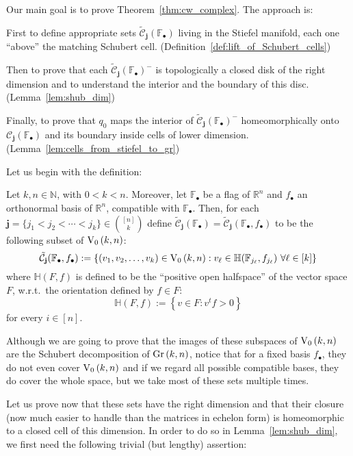 Our main goal is to prove Theorem~\ref{thm:cw_complex}. The approach is:
\begin{i_enum}
\item First to define appropriate sets $\tilde{\mathcal{C}}_{\mathbf{j}}(\mathbb{F}_{\bullet})$ living in the Stiefel manifold, each one ``above'' the matching Schubert cell. (Definition~\ref{def:lift_of_Schubert_cells})
\item Then to prove that each $\tilde{\mathcal{C}}_{\mathbf{j}}{\left(\mathbb{F}_{\bullet}\right)}^-$ is topologically a closed disk of the right dimension and to understand the interior and the boundary of this disc. (Lemma~\ref{lem:shub_dim})
\item Finally, to prove that $q_0$ maps the interior of $\tilde{\mathcal{C}}_{\mathbf{j}}(\mathbb{F}_{\bullet})^-$ homeomorphically onto $\mathcal{C}_{\mathbf{j}}(\mathbb{F}_{\bullet})$ and its boundary inside cells of lower dimension. (Lemma~\ref{lem:cells_from_stiefel_to_gr})
\end{i_enum}
Let us begin with the definition:

\begin{definition}\label{def:lift_of_Schubert_cells} Let $k,n\in\mathbb{N}$, with $0<k<n$. Moreover, let $\mathbb{F}_{\bullet}$ be a flag of $\mathbb{R}^n$ and $f_{\bullet}$ an orthonormal basis of $\mathbb{R}^n$, compatible with $\mathbb{F}_{\bullet}$. Then, for each $\mathbf{j}=\{j_1<j_2<\cdots<j_k\}\in\binom{[n]}{k}$ define $\tilde{\mathcal{C}}_{\mathbf{j}}(\mathbb{F}_{\bullet})=\tilde{\mathcal{C}}_{\mathbf{j}}(\mathbb{F}_{\bullet},f_{\bullet})$ to be the following subset of $\StO{k}{n}$:
\[\tilde{\mathcal{C}}_{\mathbf{j}}(\mathbb{F}_{\bullet},f_{\bullet}):=\left\{(v_1,v_2,\ldots,v_k)\in\StO{k}{n}:v_{\ell}\in\mathbb{H}(\mathbb{F}_{j_{\ell}},f_{j_{\ell}})\ \forall\ell\in[k]\right\}\]
where $\mathbb{H}(F,f)$ is defined to be the ``positive open halfspace'' of the vector space $F$, w.r.t.\ the orientation defined by $f\in F$:
\[\mathbb{H}(F,f):=\left\{v\in F:v^tf>0\right\}\]
for every $i\in[n]$.
\end{definition}

Although we are going to prove that the images of these subspaces of $\StO{k}{n}$ are the Schubert decomposition of $\Gr{k}{n}$, notice that for a fixed basis $f_{\bullet}$, they do not even cover $\StO{k}{n}$ and if we regard all possible compatible bases, they do cover the whole space, but we take most of these sets multiple times.

Let us prove now that these sets have the right dimension and that their closure (now much easier to handle than the matrices in echelon form) is homeomorphic to a closed cell of this dimension. In order to do so in Lemma~\ref{lem:shub_dim}, we first need the following trivial (but lengthy) assertion:

